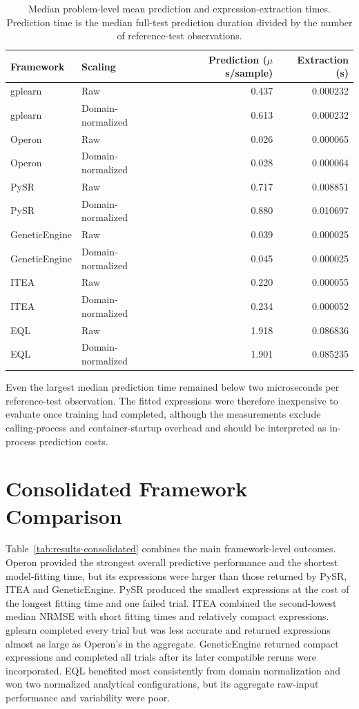 \documentclass[12pt,oneside,bibtotoc,liststotoc]{scrbook}
\begin{document}
\begin{table}[H]
    \centering
    \caption{Median problem-level mean prediction and expression-extraction times. Prediction time is the median full-test prediction duration divided by the number of reference-test observations.}
    \label{tab:results-prediction-extraction-time}
    \begin{tabular}{llrr}
        \toprule
        Framework & Scaling & Prediction ($\mu$s/sample) & Extraction (s) \\
        \midrule
        gplearn & Raw & 0.437 & 0.000232 \\
        gplearn & Domain-normalized & 0.613 & 0.000232 \\
        Operon & Raw & 0.026 & 0.000065 \\
        Operon & Domain-normalized & 0.028 & 0.000064 \\
        PySR & Raw & 0.717 & 0.008851 \\
        PySR & Domain-normalized & 0.880 & 0.010697 \\
        GeneticEngine & Raw & 0.039 & 0.000025 \\
        GeneticEngine & Domain-normalized & 0.045 & 0.000025 \\
        ITEA & Raw & 0.220 & 0.000055 \\
        ITEA & Domain-normalized & 0.234 & 0.000052 \\
        EQL & Raw & 1.918 & 0.086836 \\
        EQL & Domain-normalized & 1.901 & 0.085235 \\
        \bottomrule
    \end{tabular}
\end{table}

Even the largest median prediction time remained below two microseconds per reference-test observation. The fitted expressions were therefore inexpensive to evaluate once training had completed, although the measurements exclude calling-process and container-startup overhead and should be interpreted as in-process prediction costs.

\section{Consolidated Framework Comparison}

Table~\ref{tab:results-consolidated} combines the main framework-level outcomes. Operon provided the strongest overall predictive performance and the shortest model-fitting time, but its expressions were larger than those returned by PySR, ITEA and GeneticEngine. PySR produced the smallest expressions at the cost of the longest fitting time and one failed trial. ITEA combined the second-lowest median NRMSE with short fitting times and relatively compact expressions. gplearn completed every trial but was less accurate and returned expressions almost as large as Operon's in the aggregate. GeneticEngine returned compact expressions and completed all trials after its later compatible reruns were incorporated. EQL benefited most consistently from domain normalization and won two normalized analytical configurations, but its aggregate raw-input performance and variability were poor.
\end{document}
